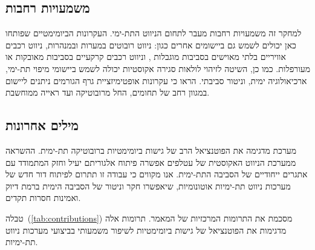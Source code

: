\subsection{משמעויות רחבות}
\label{sec:broader_implications}

למחקר זה משמעויות רחבות מעבר לתחום הניווט התת-ימי. העקרונות הביומימטיים שפותחו כאן יכולים לשמש גם ביישומים אחרים כגון: ניווט רובוטים במערות ובמנהרות, ניווט רכבים אוויריים בלתי מאוישים בסביבות מוגבלות , וניווט רכבים קרקעיים בסביבות מאובקות או מעורפלות. כמו כן, השיטה לזיהוי לולאות סגירה אקוסטיות יכולה לשמש ביישומי מיפוי תת-ימי, ארכיאולוגיה ימית, וניטור סביבתי. \citet{Grisetti2010g2o} הראו כי עקרונות אופטימיזציית גרף הגורמים ניתנים ליישום במגוון רחב של תחומים, החל מרובוטיקה ועד ראייה ממוחשבת.

\subsection{מילים אחרונות}
\label{sec:final_remarks}

מערכת  מדגימה את הפוטנציאל הרב של גישות ביומימטיות ברובוטיקה תת-ימית. ההשראה ממערכת הניווט האקוסטית של עטלפים אפשרה פיתוח אלגוריתם יעיל וחזק המתמודד עם אתגרים ייחודיים של הסביבה התת-ימית. אנו מקווים כי עבודה זו תתרום לפיתוח דור חדש של מערכות ניווט תת-ימיות אוטונומיות, שיאפשרו חקר וניטור של הסביבה הימית ברמת דיוק ואמינות חסרות תקדים.

\begin{table}[htbp]
    \centering
    \caption{סיכום התרומות המרכזיות של המאמר. (Summary of the main contributions of the paper.)}
    \label{tab:contributions}
\end{table}

טבלה~(\ref{tab:contributions}) מסכמת את התרומות המרכזיות של המאמר. תרומות אלה מדגימות את הפוטנציאל של גישות ביומימטיות לשיפור משמעותי בביצועי מערכות ניווט תת-ימיות.


